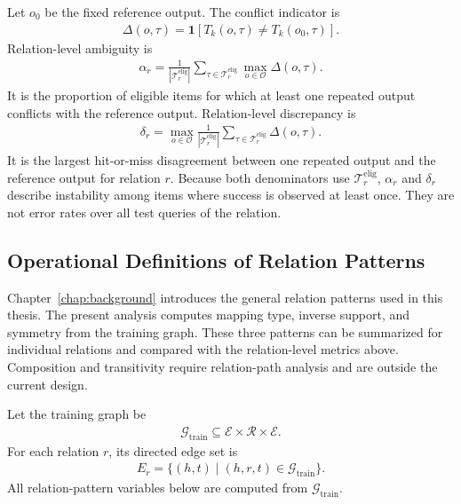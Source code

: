 Let $o_0$ be the fixed reference output. The conflict indicator is
\begin{align}
    \Delta(o,\tau)
    =
    \mathbf{1}\!\left[T_k(o,\tau)\neq T_k(o_0,\tau)\right].
\end{align}
Relation-level ambiguity is
\begin{align}
    \alpha_r
    =
    \frac{1}{|\mathcal{T}^{\mathrm{elig}}_r|}
    \sum_{\tau\in\mathcal{T}^{\mathrm{elig}}_r}
    \max_{o\in\mathcal{O}}
    \Delta(o,\tau).
\end{align}
It is the proportion of eligible items for which at least one repeated output
conflicts with the reference output. Relation-level discrepancy is
\begin{align}
    \delta_r
    =
    \max_{o\in\mathcal{O}}
    \frac{1}{|\mathcal{T}^{\mathrm{elig}}_r|}
    \sum_{\tau\in\mathcal{T}^{\mathrm{elig}}_r}
    \Delta(o,\tau).
\end{align}
It is the largest hit-or-miss disagreement between one repeated output and the
reference output for relation $r$. Because both denominators use
$\mathcal{T}^{\mathrm{elig}}_r$, $\alpha_r$ and $\delta_r$ describe
instability among items where success is observed at least once. They are not
error rates over all test queries of the relation.

\subsection{Operational Definitions of Relation Patterns}

Chapter~\ref{chap:background} introduces the general relation patterns used in
this thesis. The present analysis computes mapping type, inverse support, and
symmetry from the training graph. These three patterns can be summarized for
individual relations and compared with the relation-level metrics above.
Composition and transitivity require relation-path analysis and are outside the
current design.

Let the training graph be
\begin{align}
    \mathcal{G}_{\mathrm{train}}
    \subseteq
    \mathcal{E}\times\mathcal{R}\times\mathcal{E}.
\end{align}
For each relation $r$, its directed edge set is
\begin{align}
    E_r
    =
    \{(h,t)\mid(h,r,t)\in\mathcal{G}_{\mathrm{train}}\}.
\end{align}
All relation-pattern variables below are computed from
$\mathcal{G}_{\mathrm{train}}$.

